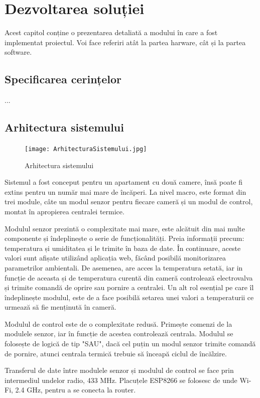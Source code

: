 \chapter{Dezvoltarea soluției}\label{ch:4dezvoltareaSolutiei}

	Acest capitol conține o prezentarea detaliată a modului în care a fost implementat proiectul. Voi face referiri atât la partea harware, cât și la partea software. 

\section{Specificarea cerințelor}
	...

\section{Arhitectura sistemului}

\begin{figure}[H]
   	\centering
    	\texttt{[image: ArhitecturaSistemului.jpg]}
	\caption{Arhitectura sistemului}
\end{figure}

	Sistemul a fost conceput pentru un apartament cu două camere, însă poate fi extins pentru un număr mai mare de încăperi. La nivel macro, este format din trei module, câte un modul senzor pentru fiecare cameră și un modul de control, montat în apropierea centralei termice.

	Modulul senzor prezintă o complexitate mai mare, este alcătuit din mai multe componente și îndeplinește o serie de funcționalități. Preia informații precum: temperatura și umiditatea și le trimite în baza de date. În continuare, aceste valori sunt afișate utilizând aplicația web, făcând posibilă monitorizarea parametrilor ambientali. De asemenea, are acces la temperatura setată, iar in funcție de aceasta și de temperatura curentă din cameră controlează electrovalva și trimite comandă de oprire sau pornire a centralei. Un alt rol esențial pe care îl îndeplinește modulul, este de a face posibilă setarea unei valori a temperaturii ce urmează să fie menținută în cameră.

	Modulul de control este de o complexitate redusă. Primește comenzi de la modulele senzor, iar în funcție de acestea controlează centrala. Modulul se folosește de logică de tip "SAU", dacă cel puțin un modul senzor trimite comandă de pornire, atunci centrala termică trebuie să înceapă ciclul de încălzire.

	Transferul de date între modulele senzor și modulul de control se face prin intermediul undelor radio, 433 MHz. Placuțele ESP8266 se folosesc de unde Wi-Fi, 2.4 GHz, pentru a se conecta la router.

